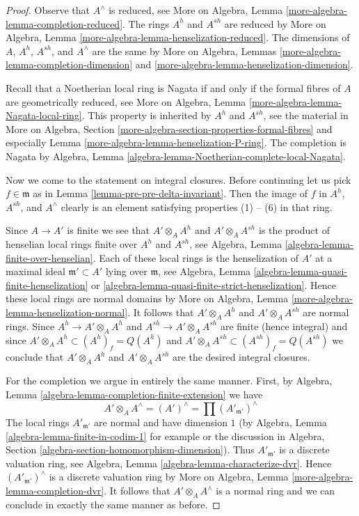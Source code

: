 \begin{proof}
Observe that $A^\wedge$ is reduced, see
More on Algebra, Lemma \ref{more-algebra-lemma-completion-reduced}.
The rings $A^h$ and $A^{sh}$ are reduced by
More on Algebra, Lemma \ref{more-algebra-lemma-henselization-reduced}.
The dimensions of $A$, $A^h$, $A^{sh}$, and $A^\wedge$ are the same
by More on Algebra, Lemmas
\ref{more-algebra-lemma-completion-dimension} and
\ref{more-algebra-lemma-henselization-dimension}.

\medskip\noindent
Recall that a Noetherian local ring is Nagata if and only if the
formal fibres of $A$ are geometrically reduced, see
More on Algebra, Lemma \ref{more-algebra-lemma-Nagata-local-ring}.
This property is inherited by $A^h$ and $A^{sh}$, see
the material in More on Algebra, Section
\ref{more-algebra-section-properties-formal-fibres}
and especially Lemma \ref{more-algebra-lemma-henselization-P-ring}.
The completion is Nagata by
Algebra, Lemma \ref{algebra-lemma-Noetherian-complete-local-Nagata}.

\medskip\noindent
Now we come to the statement on integral closures. Before continuing
let us pick $f \in \mathfrak m$ as in
Lemma \ref{lemma-pre-pre-delta-invariant}.
Then the image of $f$ in $A^h$, $A^{sh}$, and $A^\wedge$
clearly is an element satisfying properties (1) -- (6)
in that ring.

\medskip\noindent
Since $A \to A'$ is finite we see that
$A' \otimes_A A^h$ and $A' \otimes_A A^{sh}$
is the product of henselian local rings finite over $A^h$ and
$A^{sh}$, see Algebra, Lemma \ref{algebra-lemma-finite-over-henselian}.
Each of these local rings is the henselization of $A'$ at a
maximal ideal $\mathfrak m' \subset A'$ lying over $\mathfrak m$, see
Algebra, Lemma \ref{algebra-lemma-quasi-finite-henselization} or
\ref{algebra-lemma-quasi-finite-strict-henselization}.
Hence these local rings are normal domains by
More on Algebra, Lemma \ref{more-algebra-lemma-henselization-normal}.
It follows that $A' \otimes_A A^h$ and $A' \otimes_A A^{sh}$
are normal rings. Since $A^h \to A' \otimes_A A^h$ and
$A^{sh} \to A' \otimes_A A^{sh}$ are finite (hence integral) and since
$A' \otimes_A A^h \subset (A^h)_f = Q(A^h)$ and
$A' \otimes_A A^{sh} \subset (A^{sh})_f = Q(A^{sh})$
we conclude that $A' \otimes_A A^h$ and $A' \otimes_A A^{sh}$ are
the desired integral closures.

\medskip\noindent
For the completion we argue in entirely the same manner. First,
by Algebra, Lemma \ref{algebra-lemma-completion-finite-extension} we have
$$
A' \otimes_A A^\wedge = (A')^\wedge =
\prod\nolimits (A'_{\mathfrak m'})^\wedge
$$
The local rings $A'_{\mathfrak m'}$ are normal and have dimension $1$
(by Algebra, Lemma \ref{algebra-lemma-finite-in-codim-1} for example or
the discussion in
Algebra, Section \ref{algebra-section-homomorphism-dimension}).
Thus $A'_{\mathfrak m'}$ is a discrete valuation ring, see
Algebra, Lemma \ref{algebra-lemma-characterize-dvr}.
Hence $(A'_{\mathfrak m'})^\wedge$ is a discrete valuation ring
by More on Algebra, Lemma \ref{more-algebra-lemma-completion-dvr}.
It follows that $A' \otimes_A A^\wedge$ is a normal ring and
we can conclude in exactly the same manner as before.
\end{proof}

